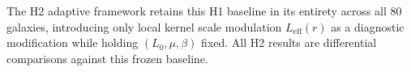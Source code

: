 \documentclass{aa}
\begin{document}
The H2 adaptive framework retains this H1 baseline in its entirety across all 80 galaxies, introducing only local kernel scale modulation $L_{\mathrm{eff}}(r)$ as a diagnostic modification while holding $(L_0, \mu, \beta)$ fixed. All H2 results are differential comparisons against this frozen baseline.


\end{document}
